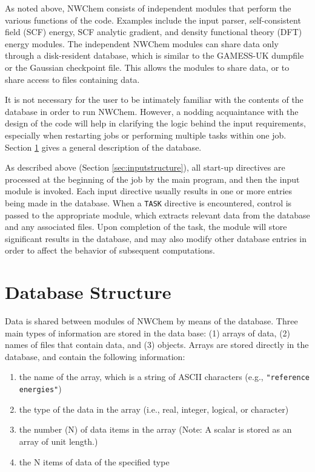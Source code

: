 %
%
\label{sec:arch}

As noted above, NWChem consists of independent modules that perform
the various functions of the code.  Examples include the input parser,
self-consistent field (SCF) energy, SCF analytic gradient, and density
functional theory (DFT) energy modules.  The independent NWChem
modules can share data only through a disk-resident database, which is
similar to the GAMESS-UK dumpfile or the Gaussian checkpoint file.
This allows the modules to share data, or to share
access to files containing data.

It is not necessary for the user to be intimately familiar with the
contents of the database in order to run NWChem.  However, a nodding
acquaintance with the design of the code will help in clarifying the
logic behind the input requirements, especially when restarting jobs
or performing multiple tasks within one job.  Section
\ref{sec:database} gives a general description of the database.

As described above (Section \ref{sec:inputstructure}), all start-up
directives are processed at the beginning of the job by the main
program, and then the input module is invoked.  Each input directive
usually results in one or more entries being made in the database.
When a \verb+TASK+ directive is encountered, control is passed to the
appropriate module, which extracts relevant data from the database and
any associated files.  Upon completion of the task, the module will
store significant results in the database, and may also modify other
database entries in order to affect the behavior of subsequent
computations.

\section{Database Structure}
\label{sec:database}

\sloppy

Data is shared between modules of NWChem by means of the database.
Three main types of information are stored in the data base: (1)
arrays of data, (2) names of files that contain data, and (3) objects.
Arrays are stored directly in the database, and contain the following
information:
\begin{enumerate}
\item the name of the array, which is a string of ASCII characters
  (e.g., \verb+"reference energies"+)
\item the type of the data in the array (i.e., real, integer, logical,
  or character)
\item the number (N) of data items in the array (Note: A scalar is
  stored as an array of unit length.)
\item the N items of data of the specified type
\end{enumerate}

